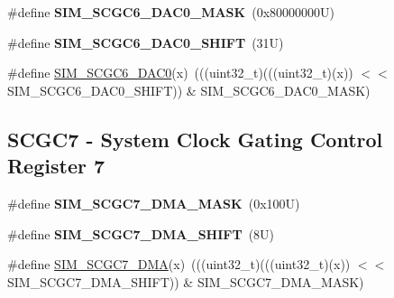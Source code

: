 \begin{DoxyCompactItemize}
\item 
\mbox{\label{group___s_i_m___register___masks_ga67d96adcce9fece065ce6a7f57f495a1}} 
\#define {\bfseries S\+I\+M\+\_\+\+S\+C\+G\+C6\+\_\+\+D\+A\+C0\+\_\+\+M\+A\+SK}~(0x80000000\+U)
\item 
\mbox{\label{group___s_i_m___register___masks_ga263123e8c1970021957fa8e72cf4a25a}} 
\#define {\bfseries S\+I\+M\+\_\+\+S\+C\+G\+C6\+\_\+\+D\+A\+C0\+\_\+\+S\+H\+I\+FT}~(31\+U)
\item 
\#define \mbox{\hyperlink{group___s_i_m___register___masks_ga8fe68abfa8f4b9852083e040d38c30b0}{S\+I\+M\+\_\+\+S\+C\+G\+C6\+\_\+\+D\+A\+C0}}(x)~(((uint32\+\_\+t)(((uint32\+\_\+t)(x)) $<$$<$ S\+I\+M\+\_\+\+S\+C\+G\+C6\+\_\+\+D\+A\+C0\+\_\+\+S\+H\+I\+FT)) \& S\+I\+M\+\_\+\+S\+C\+G\+C6\+\_\+\+D\+A\+C0\+\_\+\+M\+A\+SK)
\end{DoxyCompactItemize}
\subsection*{S\+C\+G\+C7 -\/ System Clock Gating Control Register 7}
\begin{DoxyCompactItemize}
\item 
\mbox{\label{group___s_i_m___register___masks_gac559e129885604991932101719e3b368}} 
\#define {\bfseries S\+I\+M\+\_\+\+S\+C\+G\+C7\+\_\+\+D\+M\+A\+\_\+\+M\+A\+SK}~(0x100\+U)
\item 
\mbox{\label{group___s_i_m___register___masks_ga1113f1622eb2e4099653e93943a89c6e}} 
\#define {\bfseries S\+I\+M\+\_\+\+S\+C\+G\+C7\+\_\+\+D\+M\+A\+\_\+\+S\+H\+I\+FT}~(8\+U)
\item 
\#define \mbox{\hyperlink{group___s_i_m___register___masks_gab654fa6242c7052090ea5e5aae4e5b18}{S\+I\+M\+\_\+\+S\+C\+G\+C7\+\_\+\+D\+MA}}(x)~(((uint32\+\_\+t)(((uint32\+\_\+t)(x)) $<$$<$ S\+I\+M\+\_\+\+S\+C\+G\+C7\+\_\+\+D\+M\+A\+\_\+\+S\+H\+I\+FT)) \& S\+I\+M\+\_\+\+S\+C\+G\+C7\+\_\+\+D\+M\+A\+\_\+\+M\+A\+SK)
\end{DoxyCompactItemize}
